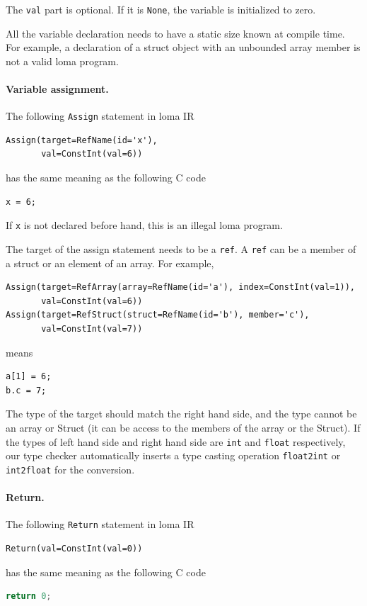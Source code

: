 The \lstinline{val} part is optional. If it is \lstinline{None}, the variable is initialized to zero.

All the variable declaration needs to have a static size known at compile time. For example, a declaration of a struct object with an unbounded array member is not a valid loma program. 

\paragraph{Variable assignment.}
The following \lstinline{Assign} statement in loma IR
\begin{lstlisting}
Assign(target=RefName(id='x'),
       val=ConstInt(val=6))
\end{lstlisting}
has the same meaning as the following C code
\begin{lstlisting}
x = 6;
\end{lstlisting}
If \lstinline{x} is not declared before hand, this is an illegal loma program.

The target of the assign statement needs to be a \lstinline{ref}. A \lstinline{ref} can be a member of a struct or an element of an array. For example,
\begin{lstlisting}
Assign(target=RefArray(array=RefName(id='a'), index=ConstInt(val=1)),
       val=ConstInt(val=6))
Assign(target=RefStruct(struct=RefName(id='b'), member='c'),
       val=ConstInt(val=7))
\end{lstlisting}
means
\begin{lstlisting}
a[1] = 6;
b.c = 7;
\end{lstlisting}

The type of the target should match the right hand side, and the type cannot be an array or Struct (it can be access to the members of the array or the Struct). If the types of left hand side and right hand side are \lstinline{int} and \lstinline{float} respectively, our type checker automatically inserts a type casting operation \lstinline{float2int} or \lstinline{int2float} for the conversion.

\paragraph{Return.}
The following \lstinline{Return} statement in loma IR
\begin{lstlisting}
Return(val=ConstInt(val=0))
\end{lstlisting}
has the same meaning as the following C code
\begin{lstlisting}[language=c]
return 0;
\end{lstlisting}

